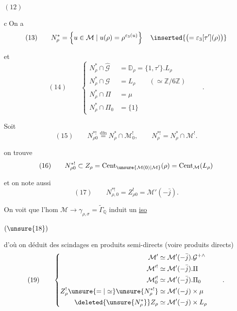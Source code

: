 \begin{samepage}
\( (12) \)\quad
{}
\end{samepage}


\textcircled{c}\quad On a
\[
(13)\qquad
N_\rho^*=\left\{u\in\mathcal M\mid u(\rho)=\rho^{\varepsilon_3(u)}\right\}
\quad\inserted{\bigl(=\varepsilon_3[\tau'](\rho)\bigr)}
\]

et
\[
(14)\qquad
\left\{\begin{aligned}
N_\rho^*\cap\widehat{\mathcal G}
  &=\mathbb D_\rho=\{1,\tau'\}.L_\rho\\
N_\rho^*\cap\mathcal G
  &=L_\rho\qquad(\simeq\mathbb Z/6\mathbb Z)\\
N_\rho^*\cap\Pi&=\mu\\
N_\rho^*\cap\Pi_0&=\{1\}
\end{aligned}\right.\qquad .
\]


Soit
\[
(15)\qquad
N_{\rho0}^{*!}\overset{\mathrm{dfn}}=N_\rho^*\cap\mathcal M_0^!,
\qquad N_\rho^{*!}=N_\rho^*\cap\mathcal M^!.
\]

on trouve
\[
(16)\qquad
N_{\rho0}^{*!}\subset Z_\rho
=\operatorname{Cent}_{\unsure{\mathcal M(0)|\mathcal M}}(\rho)
=\operatorname{Cent}_{\mathcal M}(L_\rho)
\]

et on note aussi
\[
(17)\qquad N_{\rho,0}^{*!}=Z_{\rho0}^{!}=\mathcal M'(-\bar j).
\]

On voit que l'hom $\mathcal M\to\gamma_{\rho,\sigma}
=\widetilde{\Gamma}_{\mathbb Q}$ induit un \uline{iso}

\( (\unsure{18}) \)\quad
{}

d'où on déduit des scindages en produits semi-directs
(voire produits directs)
\[
(19)\qquad
\left\{\begin{aligned}
\mathcal M'&\simeq\mathcal M'(-\bar j).\mathcal G^{+\wedge}\\
\mathcal M^{\prime!}&\simeq\mathcal M'(-\bar j).\Pi\\
\mathcal M_0^{\prime!}&\simeq\mathcal M'(-\bar j).\Pi_0\\
Z_\rho^!\unsure{=|\simeq}\unsure{N_\rho^{*!}}
  &\simeq\mathcal M'(-j)\times\mu\\
\deleted{\unsure{N_\rho^*}}Z_\rho
  &\simeq\mathcal M'(-j)\times L_\rho
\end{aligned}\right.\qquad .
\]

